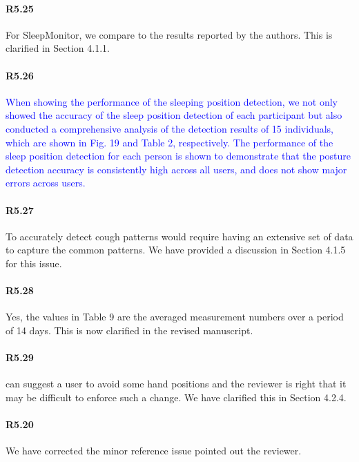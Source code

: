\paragraph{R5.25} For SleepMonitor, we compare to the results reported by the authors. This is clarified in Section 4.1.1.

\paragraph{R5.26} \textcolor{blue}{When showing the performance of the sleeping position detection, we not only showed the accuracy of the sleep position detection of each participant but also conducted a comprehensive analysis of the detection results of 15 individuals, which are shown in Fig. 19 and Table 2, respectively. The performance of the sleep position detection for each person is shown to demonstrate that the posture detection accuracy is consistently high across all users, and does not show major errors across users.}

\paragraph{R5.27} To accurately detect cough patterns would require having an extensive set of data to capture the common patterns. We have provided a discussion in Section 4.1.5 for this issue.

\paragraph{R5.28} Yes, the values in Table 9 are the averaged measurement numbers over a period of 14 days. This is now clarified in the revised manuscript.

\paragraph{R5.29} \systemname can suggest a user to avoid some hand positions and the reviewer is right that it may be difficult to enforce such a change. We have clarified this in Section 4.2.4.

\paragraph{R5.20} We have corrected the minor reference issue pointed out the reviewer.
